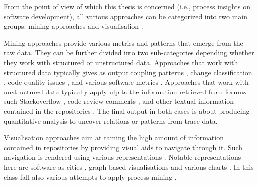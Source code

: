 From the point of view of which this thesis is concerned (i.e., process insights on software development), all various approaches can be categorized into two main groups: mining approaches and visualisation . 

Mining approaches provide various metrics and patterns that emerge from the raw data. They can be further divided into two sub-categories depending whether they work with structured or unstructured data. Approaches that work with structured data typically gives as output coupling patterns \citep{DBLP:conf/msr/SouzaM13,DBLP:journals/smr/KirbasCHCBSB17,DBLP:journals/ese/WenNLB22}, change classification \citep{kaur2018gcc,DBLP:journals/ese/HerzigJZ16}, code quality issues \citep{DBLP:conf/msr/KieferBT07,DBLP:conf/msr/ChenTNH12,DBLP:conf/icse/WangLT16}, and various software metrics \citep{DBLP:conf/icst/ZaidmanRDD08,DBLP:conf/icse/Thomas11,DBLP:conf/scam/SokolAG13}. Approaches that work with unstructured data typically apply \gls{nlp} to the information retrieved from forums such Stackoverflow \citep{DBLP:conf/msr/PonzanelliBPOL14}, code-review comments \citep{DBLP:conf/msr/OmranT17}, and other textual information contained in the repositories \citep{DBLP:journals/ese/BaruaTH14,DBLP:journals/jss/YanFZYXK16}. The final output in both cases is about producing quantitative analysis to uncover relations or patterns from trace data.

Visualisation approaches aim at taming the high amount of information contained in repositories by providing visual aids to navigate through it. Such navigation is rendered using various representations \citep{DBLP:journals/scp/TorresGSP16}. Notable representations here are software as cities \cite{DBLP:conf/vissoft/WettelL07} , graph-based visualisations \cite{DBLP:conf/icse/BhattacharyaINF12} and various charts \cite{DAmbros2009,DBLP:conf/msr/BirdGDGS06}. In this class fall also various attempts to apply process mining \cite{rubin2014process, DBLP:conf/indiaSE/GuptaS14,DBLP:conf/wecwis/MarquesSF18,DBLP:conf/bpm/JookenCJ19}. 

%

% 

